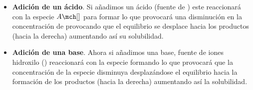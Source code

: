 \begin{enumerate}[label=\numberballmDarkTeal]
        \begin{itemize}
            \item \textbf{Adición de un ácido}.
            Si añadimos un ácido (fuente de ) este reaccionará con la especie \( A\mch[] \) para formar  lo que provocará una disminución en la concentración de  provocando que el equilibrio se desplace hacia los productos (hacia la derecha) aumentando así su solubilidad.
            \item \textbf{Adición de una base}.
            Ahora si añadimos una base, fuente de iones hidroxilo () reaccionará con la especie  formando  lo que provocará que la concentración de la especie  disminuya desplazándose el equilibrio hacia la formación de los productos (hacia la derecha) aumentando así la solubilidad.
        \end{itemize}

    \end{enumerate}
%
%
%

